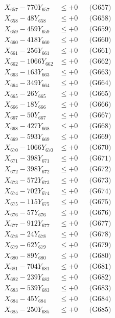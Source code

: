 \documentclass[a4paper,10pt]{article}
\begin{document}
{\begin{align}
X_{657} - 770Y_{657} &\leq +0 && \text{(G657)} \\
X_{658} - 48Y_{658} &\leq +0 && \text{(G658)} \\
X_{659} - 459Y_{659} &\leq +0 && \text{(G659)} \\
X_{660} - 418Y_{660} &\leq +0 && \text{(G660)} \\
\allowbreak
X_{661} - 256Y_{661} &\leq +0 && \text{(G661)} \\
X_{662} - 1066Y_{662} &\leq +0 && \text{(G662)} \\
X_{663} - 163Y_{663} &\leq +0 && \text{(G663)} \\
X_{664} - 349Y_{664} &\leq +0 && \text{(G664)} \\
X_{665} - 26Y_{665} &\leq +0 && \text{(G665)} \\
X_{666} - 18Y_{666} &\leq +0 && \text{(G666)} \\
X_{667} - 50Y_{667} &\leq +0 && \text{(G667)} \\
X_{668} - 427Y_{668} &\leq +0 && \text{(G668)} \\
X_{669} - 593Y_{669} &\leq +0 && \text{(G669)} \\
X_{670} - 1066Y_{670} &\leq +0 && \text{(G670)} \\
\allowbreak
X_{671} - 398Y_{671} &\leq +0 && \text{(G671)} \\
X_{672} - 398Y_{672} &\leq +0 && \text{(G672)} \\
X_{673} - 572Y_{673} &\leq +0 && \text{(G673)} \\
X_{674} - 702Y_{674} &\leq +0 && \text{(G674)} \\
X_{675} - 115Y_{675} &\leq +0 && \text{(G675)} \\
X_{676} - 57Y_{676} &\leq +0 && \text{(G676)} \\
X_{677} - 912Y_{677} &\leq +0 && \text{(G677)} \\
X_{678} - 24Y_{678} &\leq +0 && \text{(G678)} \\
X_{679} - 62Y_{679} &\leq +0 && \text{(G679)} \\
X_{680} - 89Y_{680} &\leq +0 && \text{(G680)} \\
\allowbreak
X_{681} - 704Y_{681} &\leq +0 && \text{(G681)} \\
X_{682} - 239Y_{682} &\leq +0 && \text{(G682)} \\
X_{683} - 539Y_{683} &\leq +0 && \text{(G683)} \\
X_{684} - 45Y_{684} &\leq +0 && \text{(G684)} \\
X_{685} - 250Y_{685} &\leq +0 && \text{(G685)} \\

\end{align}}
\end{document}

